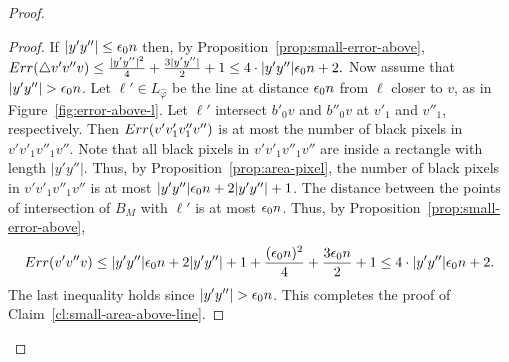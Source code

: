 \documentclass[11pt,english]{article}
\numberwithin{figure}{section}
\begin{document}
\begin{proof}
{\begin{proof}
If $|y'y''|\leq {\epsilon_0} n$ then, by Proposition~\ref{prop:small-error-above}, $Err(\bigtriangleup v'v''v)\leq \frac{|y'y''|^2}4+\frac{3|y'y''|}2+1\leq 4\cdot|y'y''|{\epsilon_0} n+2.$ Now assume that $|y'y''|>\bigdelta n$. Let $\ell'\in L_{\hat\varphi}$ be the line at distance ${\epsilon_0} n$ from $\ell$ closer to $v$, as in Figure~\ref{fig:error-above-l}. Let $\ell'$ intersect $b'_0v$ and $b''_0v$ at $v'_1$ and $v''_1$, respectively. Then $Err(v'v'_1v''_1v'')$ is at most the number of black pixels in $v'v'_1v''_1v''$. Note that all black pixels in $v'v'_1v''_1v''$ are inside a rectangle with length $|y'y''|$. Thus, by Proposition~\ref{prop:area-pixel}, the number of black pixels in $v'v'_1v''_1v''$ is at most $|y'y''|{\epsilon_0} n+2|y'y''|+1$. The distance between the points of intersection of $B_M$ with $\ell'$ is at most ${\epsilon_0} n$. Thus, by Proposition~\ref{prop:small-error-above},
$$Err(v'v''v)\leq|y'y''|{\epsilon_0} n+2|y'y''|+1+\frac{({\epsilon_0} n)^2}{4}+\frac{3{\epsilon_0} n}2+1\leq 4\cdot|y'y''|{\epsilon_0} n+2.$$ The last inequality holds since $|y'y''|>\bigdelta n$. This completes the proof of Claim~\ref{cl:small-area-above-line}.
\end{proof}


}
\end{proof}
\end{document}
